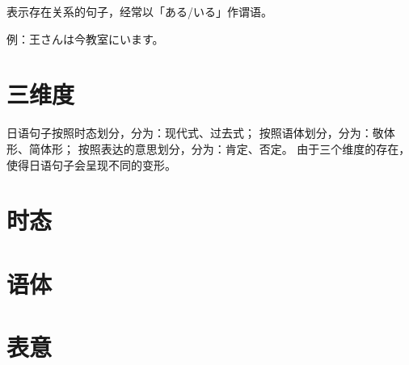     表示存在关系的句子，经常以「ある/いる」作谓语。
    
    例：王さんは今教室にいます。

    \section{三维度}

    日语句子按照时态划分，分为：现代式、过去式；
    按照语体划分，分为：敬体形、简体形；
    按照表达的意思划分，分为：肯定、否定。
    由于三个维度的存在，使得日语句子会呈现不同的变形。

    \section{时态}

    \section{语体}

    \section{表意}

\newpage
